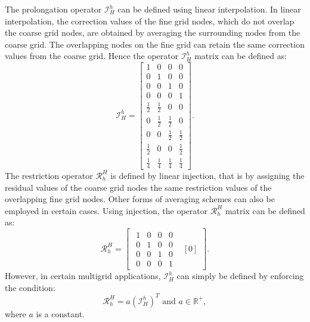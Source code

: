 The prolongation operator $\mathcal{I}_H^h$ can be defined using linear interpolation.
In linear interpolation, the correction values of the fine grid nodes, which do not overlap the coarse grid nodes, are obtained by averaging the surrounding nodes from the coarse grid.
The overlapping nodes on the fine grid can retain the same correction values from the coarse grid.
Hence the operator $\mathcal{I}_H^h$ matrix can be defined as:
\begin{equation}
	\mathcal{I}_{H}^{h}=\left[\begin{array}{cccc}
		1 & 0 & 0 & 0\\
		0 & 1 & 0 & 0\\
		0 & 0 & 1 & 0\\
		0 & 0 & 0 & 1\\
		\frac{1}{2} & \frac{1}{2} & 0 & 0\\
		0 & \frac{1}{2} & \frac{1}{2} & 0\\
		0 & 0 & \frac{1}{2} & \frac{1}{2}\\
		\frac{1}{2} & 0 & 0 & \frac{1}{2}\\
		\frac{1}{4} & \frac{1}{4} & \frac{1}{4} & \frac{1}{4}
	\end{array}\right].\label{eqn:mgIntr}
\end{equation}
The restriction operator $\mathcal{R}_{h}^{H}$ is defined by linear injection, that is by assigning the residual values of the coarse grid nodes the same restriction values of the overlapping fine grid nodes.
Other forms of averaging schemes can also be employed in certain cases.
Using injection, the operator $\mathcal{R}_{h}^{H}$ matrix can be defined as:
\begin{equation}
	\mathcal{R}_{h}^{H}=\left[
	\begin{array}{cc}
		\begin{array}{cccc}
			1 & 0 & 0 & 0\\
			0 & 1 & 0 & 0\\
			0 & 0 & 1 & 0\\
			0 & 0 & 0 & 1
		\end{array} &
		\left[0\right]
	\end{array}
	\right]. \label{eqn:mgInj}
\end{equation}
However, in certain multigrid applications, $\mathcal{I}_H^h$ can simply be defined by enforcing the condition:
\begin{equation}
	\mathcal{R}_{h}^{H} = a \left(\mathcal{I}_{H}^{h} \right)^T \,\,\textrm{and } a\in \mathbb{R}^+,
\end{equation}
where $a$ is a constant.


